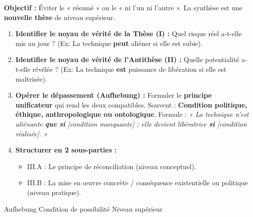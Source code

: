 \documentclass[11pt]{article}
\newcommand{\cle}[1]{{\popxbold\color{popdark}#1}}
\begin{document}
\begin{methode}
\textbf{Objectif :} Éviter le « résumé » ou le « ni l'un ni l'autre ». La synthèse est une \textbf{nouvelle thèse} de niveau supérieur.
\begin{enumerate}
    \item \textbf{Identifier le noyau de vérité de la Thèse (I) :} Quel risque réel a-t-elle mis au jour ? (Ex: La technique \textbf{peut} aliéner si elle est subie).
    \item \textbf{Identifier le noyau de vérité de l'Antithèse (II) :} Quelle potentialité a-t-elle révélée ? (Ex: La technique \textbf{est} puissance de libération si elle est maîtrisée).
    \item \textbf{Opérer le dépassement (Aufhebung) :} Formuler le \textbf{principe unificateur} qui rend les deux compatibles. Souvent : \textbf{Condition politique, éthique, anthropologique ou ontologique}. Formule : \emph{« La technique n'est aliénante \textbf{que si} [condition manquante] ; elle devient libératrice \textbf{si} [condition réalisée]. »}
    \item \textbf{Structurer en 2 sous-parties :}
        \begin{itemize}
            \item III.A : Le principe de réconciliation (niveau conceptuel).
            \item III.B : La mise en œuvre concrète / conséquence existentielle ou politique (niveau pratique).
        \end{itemize}
\end{enumerate}
\cle{Aufhebung} \cle{Condition de possibilité} \cle{Niveau supérieur}
\end{methode}
\end{document}
